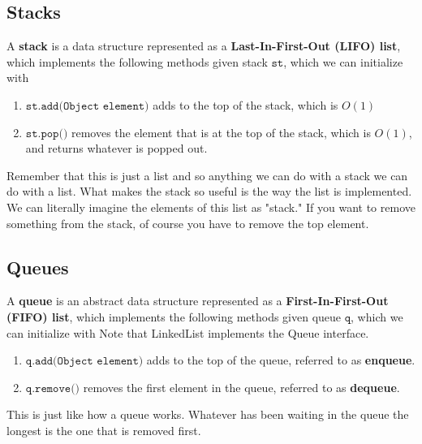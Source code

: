 \subsection{Stacks}

  \begin{definition}[Stack]
    A \textbf{stack} is a data structure represented as a \textbf{Last-In-First-Out (LIFO) list}, which implements the following methods given stack $\texttt{st}$, which we can initialize with 
    \begin{enumerate}
      \item $\texttt{st.add(Object element)}$ adds to the top of the stack, which is $O(1)$ 
      \item $\texttt{st.pop()}$ removes the element that is at the top of the stack, which is $O(1)$, and returns whatever is popped out. 
    \end{enumerate}
    Remember that this is just a list and so anything we can do with a stack we can do with a list. What makes the stack so useful is the way the list is implemented. We can literally imagine the elements of this list as "stack." If you want to remove something from the stack, of course you have to remove the top element. 
  \end{definition}

\subsection{Queues}

  \begin{definition}[Queue]
    A \textbf{queue} is an abstract data structure represented as a \textbf{First-In-First-Out (FIFO) list}, which implements the following methods given queue $\texttt{q}$, which we can initialize with Note that LinkedList implements the Queue interface. 
    \begin{enumerate}
        \item $\texttt{q.add(Object element)}$ adds to the top of the queue, referred to as \textbf{enqueue}. 
        \item $\texttt{q.remove()}$ removes the first element in the queue, referred to as \textbf{dequeue}. 
    \end{enumerate}
    This is just like how a queue works. Whatever has been waiting in the queue the longest is the one that is removed first. 
  \end{definition}

